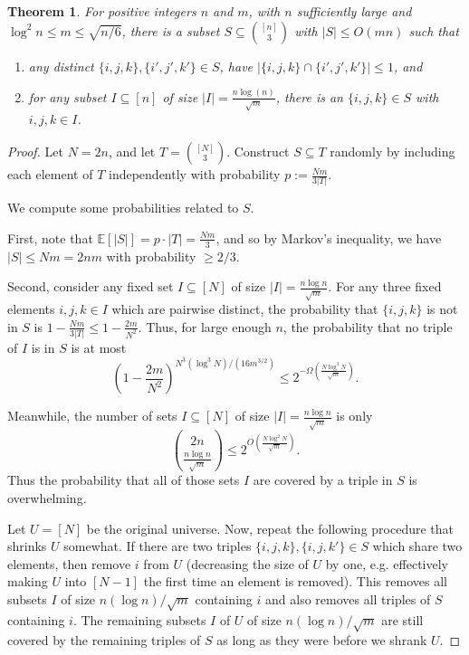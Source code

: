 \PassOptionsToPackage{shortlabels}{enumitem}\documentclass[10pt,a4paper]{article}
\newtheorem{theorem}{Theorem}[section]
\newcommand{\E}{\mathbb{E}}
\begin{document}
\begin{theorem} \label{thm:opt2}
For positive integers $n$ and $m$, with $n$ sufficiently large and $\log^2 n \leq m\leq \sqrt{n/6}$, there is a subset $S \subseteq \binom{[n]}{3}$ with $|S|\leq O(mn)$ such that
\begin{enumerate}[(1)]
    \item any distinct $\{i,j,k\},\{i',j',k'\} \in S$, have $|\{i,j,k\} \cap \{i',j',k'\}| \leq 1$, and
    \item for any subset $I \subseteq [n]$ of size $|I| = \frac{n \log (n)}{\sqrt{m}}$, there is an $\{i,j,k\} \in S$ with $i,j,k \in I$. 
\end{enumerate}
\end{theorem}

\begin{proof}
Let $N=2n$, and let $T = \binom{[N]}{3}$. Construct $S \subseteq T$ randomly by including each element of $T$ independently with probability $p := \frac{Nm}{3|T|}$. 

We compute some probabilities related to $S$.

First, note that $\E[|S|] = p \cdot |T| = \frac{Nm}{3}$, and so by Markov's inequality, we have $|S| \leq Nm=2nm$ with probability $\geq 2/3$.


Second, consider any fixed set $I \subseteq [N]$ of size $|I| = \frac{n \log n}{\sqrt{m}}$. 
For any three fixed elements $i,j,k\in I$ which are pairwise distinct, the probability that $\{i,j,k\}$ is not in $S$ is $1-\frac{Nm}{3|T|}\leq 1-\frac{2m}{N^2}$. Thus, for large enough $n$, the probability that no triple of $I$ is in $S$ is at most $$\left(1-\frac{2m}{N^2}\right)^{N^3(\log^3 N)/(16m^{3/2})}\leq 2^{-\Omega(\frac{N\log^3 N}{\sqrt{m}})}.$$

Meanwhile, the number of sets  $I \subseteq [N]$ of size $|I| = \frac{n \log n}{\sqrt{m}}$ is only
$$\binom{2n}{\frac{n \log n}{\sqrt{m}}} \leq  2^{O(\frac{N \log^2 N}{\sqrt{m}})}.$$
Thus the probability that all of those sets $I$ are covered by a triple in $S$ is overwhelming.

Let $U=[N]$ be the original universe.
Now, repeat the following procedure that shrinks $U$ somewhat. If there are two triples $\{i,j,k\},\{i,j,k'\} \in S$ which share two elements, then remove $i$ from $U$ (decreasing the size of $U$ by one, e.g. effectively making $U$ into $[N-1]$ the first time an element is removed).
This removes all subsets $I$ of size $n(\log n)/\sqrt m$ containing $i$ and also removes all triples of $S$ containing $i$.
The remaining subsets $I$ of $U$ of size $n(\log n)/\sqrt m$ are still covered by the remaining triples of $S$ as long as they were before we shrank $U$.


\end{proof}
\end{document}
